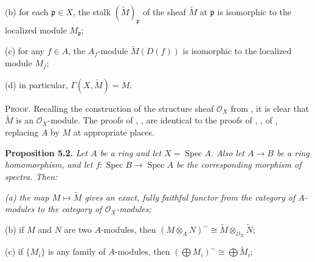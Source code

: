 {{\hypertarget{result-II-5.1b}{}(b) for each $\mathfrak p\in X$, the stalk $(\widetilde M)_{\mathfrak p}$ of the sheaf $\widetilde M$ at $\mathfrak p$ is isomorphic to the localized module $M_{\mathfrak p}$;

\hypertarget{result-II-5.1c}{}(c) for any $f\in A$, the $A_f$-module $\widetilde M(D(f))$ is isomorphic to the localized module $M_f$;

\hypertarget{result-II-5.1d}{}(d) in particular, $\Gamma(X,\widetilde M)=M$.\par}

\smallskip
\noindent\textsc{Proof.} Recalling the construction of the structure sheaf $\mathcal O_X$ from , it is clear that $\widetilde M$ is an $\mathcal O_X$-module. The proofs of , ,  are identical to the proofs of , ,  of , replacing $A$ by $M$ at appropriate places.

\medskip
\noindent\hypertarget{result-II-5.2}{}\textbf{Proposition 5.2.} \emph{Let $A$ be a ring and let $X=\operatorname{Spec}A$. Also let $A\to B$ be a ring homomorphism, and let $f\colon\operatorname{Spec}B\to\operatorname{Spec}A$ be the corresponding morphism of spectra. Then:}
\par{\itshape\leftskip=12pt
\hypertarget{result-II-5.2a}{}(a) the map $M\mapsto\widetilde M$ gives an \emph{exact}, fully faithful functor from the category of $A$-modules to the category of $\mathcal O_X$-modules;

\hypertarget{result-II-5.2b}{}(b) if $M$ and $N$ are two $A$-modules, then $(M\otimes_A N)^\sim\cong\widetilde M\otimes_{\mathcal O_X}\widetilde N$;

\hypertarget{result-II-5.2c}{}(c) if $\{M_i\}$ is any family of $A$-modules, then $(\bigoplus M_i)^\sim\cong\bigoplus\widetilde M_i$;\par}
}
